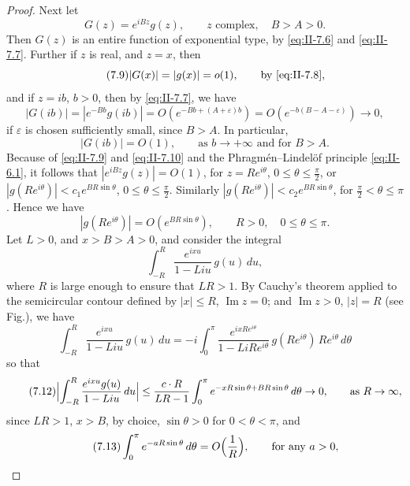 \begin{proof}
Next let
\begin{equation}\tag{7.8}\label{eq:II-7.8}
G(z)=e^{iBz}g(z),\qquad z\text{ complex},\quad B>A>0.
\end{equation}
Then $G(z)$ is an entire function of exponential type, by \eqref{eq:II-7.6} and \eqref{eq:II-7.7}. Further if $z$ is real, and $z=x$, then
\begin{equation}\tag{7.9}\label{eq:II-7.9}
|G(x)|=|g(x)|=o(1),\qquad\text{by \eqref{eq:II-7.8}},
\end{equation}
and if $z=ib$, $b>0$, then by \eqref{eq:II-7.7}, we have
\[
|G(ib)|=|e^{-Bb}g(ib)|=O(e^{-Bb+(A+\varepsilon)b})=O(e^{-b(B-A-\varepsilon)})\to 0,
\]
if $\varepsilon$ is chosen sufficiently small, since $B>A$. In particular,
\begin{equation}\tag{7.10}\label{eq:II-7.10}
|G(ib)|=O(1),\qquad\text{as }b\to+\infty\text{ and for }B>A.
\end{equation}
Because of \eqref{eq:II-7.9} and \eqref{eq:II-7.10} and the Phragm\'en--Lindel\"of principle \eqref{eq:II-6.1}, it follows that $|e^{iBz}g(z)|=O(1)$, for $z=Re^{i\theta}$, $0\le\theta\le\frac{\pi}{2}$, or $|g(Re^{i\theta})|<c_{1}e^{BR\sin\theta}$, $0\le\theta\le\frac{\pi}{2}$. Similarly $|g(Re^{i\theta})|<c_{2}e^{BR\sin\theta}$, for $\frac{\pi}{2}<\theta\le\pi$. Hence we have
\begin{equation}\tag{7.11}\label{eq:II-7.11}
|g(Re^{i\theta})|=O(e^{BR\sin\theta}),\qquad R>0,\quad 0\le\theta\le\pi.
\end{equation}
Let $L>0$, and $x>B>A>0$, and consider the integral
\[
\int_{-R}^{R}\frac{e^{ixu}}{1-Liu}\,g(u)\,du,
\]
where $R$ is large enough to ensure that $LR>1$. By Cauchy's theorem applied to the semicircular contour defined by $|x|\le R$, $\operatorname{Im}z=0$; and $\operatorname{Im}z>0$, $|z|=R$ (see Fig.), we have
\[
\int_{-R}^{R}\frac{e^{ixu}}{1-Liu}\,g(u)\,du
=-i\int_{0}^{\pi}\frac{e^{ixRe^{i\theta}}}{1-LiRe^{i\theta}}\,g(Re^{i\theta})\,Re^{i\theta}\,d\theta
\]
so that
\begin{equation}\tag{7.12}\label{eq:II-7.12}
\Bigl|\int_{-R}^{R}\frac{e^{ixu}g(u)}{1-Liu}\,du\Bigr|
\le\frac{c\cdot R}{LR-1}\int_{0}^{\pi}e^{-xR\sin\theta+B R\sin\theta}\,d\theta\to 0,\qquad\text{as }R\to\infty,
\end{equation}
since $LR>1$, $x>B$, by choice, $\sin\theta>0$ for $0<\theta<\pi$, and
\begin{equation}\tag{7.13}\label{eq:II-7.13}
\int_{0}^{\pi}e^{-aR\sin\theta}\,d\theta=O\Bigl(\frac{1}{R}\Bigr),\qquad\text{for any }a>0,
\end{equation}

\end{proof}
